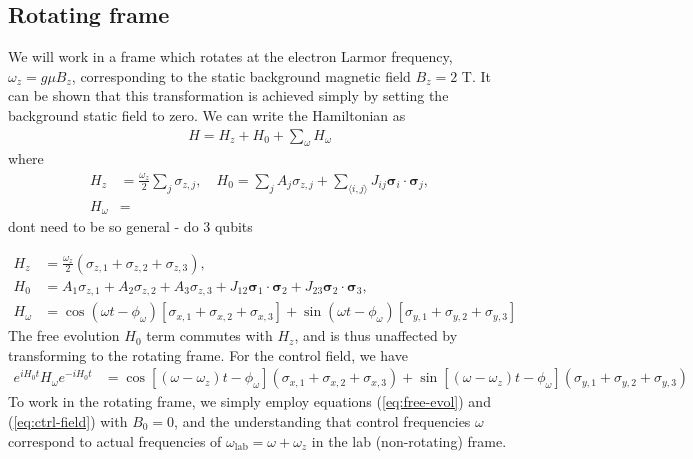 \documentclass[12pt]{article}
\begin{document}
\subsection{Rotating frame}
We will work in a frame which rotates at the electron Larmor frequency, $\omega_z=g\mu B_z$, corresponding to the static background magnetic field $B_z=2$ T. It can be shown that this transformation is achieved simply by setting the background static field to zero. We can write the Hamiltonian as 
\begin{align}
    H = H_z+H_0+\sum_\omega H_\omega
\end{align}
where 
\begin{align}
    H_z &= \frac{\omega_z}{2}\sum_j\sigma_{z,j},\quad H_0 = \sum_j A_j \sigma_{z,j} + \sum_{\langle i,j\rangle} J_{ij}\bm{\sigma}_i\cdot\bm{\sigma}_j,\\
    H_\omega &= 
\end{align}
dont need to be so general - do 3 qubits 

\begin{align}
    H_z &= \frac{\omega_z}{2}(\sigma_{z,1}+\sigma_{z,2}+\sigma_{z,3}),\\ 
    H_0 &= A_1 \sigma_{z,1} +A_2 \sigma_{z,2}+A_3\sigma_{z,3} +  J_{12}\bm{\sigma}_1\cdot\bm{\sigma}_2+ J_{23}\bm{\sigma}_2\cdot\bm{\sigma}_3,\label{eq:free-evol}\\
    H_\omega &= \cos(\omega t - \phi_\omega)[\sigma_{x,1} + \sigma_{x,2}+\sigma_{x,3}] + \sin(\omega t - \phi_\omega)[\sigma_{y,1} + \sigma_{y,2}+\sigma_{y,3}] \label{eq:ctrl-field}
\end{align}
The free evolution $H_0$ term commutes with $H_z$, and is thus unaffected by transforming to the rotating frame. For the control field, we have
\begin{align}
    e^{iH_{0}t}H_{\omega} e^{-iH_0t} &= \cos{[(\omega-\omega_z) t - \phi_\omega]}(\sigma_{x,1} + \sigma_{x,2}+\sigma_{x,3}) + \sin {[(\omega-\omega_z) t - \phi_{\omega}]} (\sigma_{y,1} + \sigma_{y,2}+\sigma_{y,3})
\end{align}
To work in the rotating frame, we simply employ equations (\ref{eq:free-evol}) and (\ref{eq:ctrl-field}) with $B_0=0$, and the understanding that control frequencies $\omega$ correspond to actual frequencies of $\omega_{\text{lab}} = \omega+\omega_z$ in the lab (non-rotating) frame.
\end{document}
